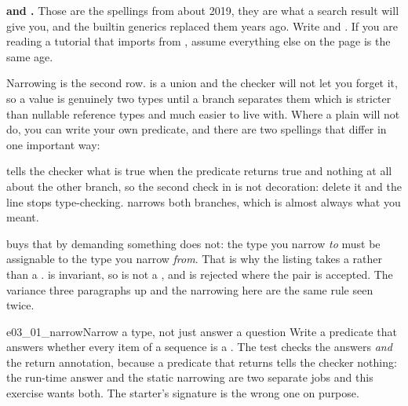 \begin{trapbox}
\textbf{ and .} Those are the spellings
from about 2019, they are what a search result will give you, and the
builtin generics replaced them years ago. Write  and
. If you are reading a tutorial that imports 
from , assume everything else on the page is the same age.
\end{trapbox}

Narrowing is the second row.  is a union and the checker
will not let you forget it, so a value is genuinely two types until a branch
separates them \dash{} which is stricter than nullable reference types and
much easier to live with. Where a plain  will not do, you
can write your own predicate, and there are two spellings that differ in one
important way:


\noindent
{} tells the checker what is true when the predicate returns
true and nothing at all about the other branch, so the second check in
 is not decoration: delete it and the line stops
type-checking.  narrows both branches, which is almost always
what you meant.

\begin{note}
 buys that by demanding something  does not: the
type you narrow \emph{to} must be assignable to the type you narrow
\emph{from}. That is why the listing takes a  rather than a
.  is invariant, so  is not a
, and  is
rejected where the  pair is accepted. The variance three
paragraphs up and the narrowing here are the same rule seen twice.
\end{note}

\begin{exercise}{e03_01_narrow}{Narrow a type, not just answer a question}
Write a predicate that answers whether every item of a sequence is a
. The test checks the answers \emph{and} the return annotation,
because a predicate that returns  tells the checker nothing: the
run-time answer and the static narrowing are two separate jobs and this
exercise wants both. The starter's signature is the wrong one on purpose.
\end{exercise}


